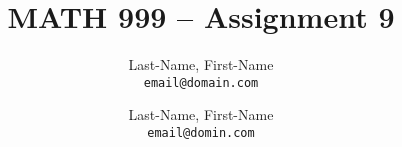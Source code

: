 \newcommand{\preamblefolder}{./include}       %

\usepackage[enable]{easy-todo}                %




\title{MATH 999 -- Assignment 9}
\author{
  Last-Name, First-Name\\
  \texttt{email@domain.com}\\
 \and
 Last-Name, First-Name\\
 \texttt{email@domin.com}
}



  \maketitle

